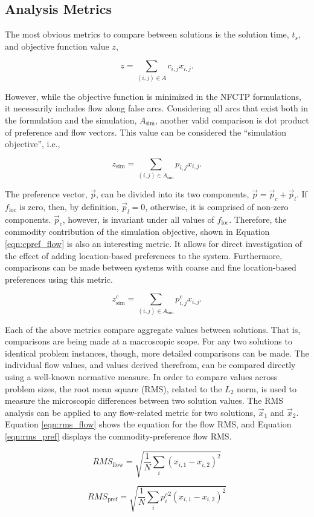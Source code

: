 \subsection{Analysis Metrics}

The most obvious metrics to compare between solutions is the solution time,
$t_s$, and objective function value $z$,

\begin{equation}\label{eqn:obj_flow}
z = \sum_{(i, j) \in A} c_{i, j} x_{i, j}.
\end{equation}

However, while the objective function is minimized in the NFCTP formulations, it
necessarily includes flow along false arcs. Considering all arcs that exist both
in the formulation and the simulation, $A_{\text{sim}}$, another valid
comparison is dot product of preference and flow vectors. This value can be
considered the ``simulation objective'', i.e.,

\begin{equation}\label{eqn:sim_flow}
z_{\text{sim}} = \sum_{(i, j) \in A_{\text{sim}}} p_{i, j} x_{i, j}.
\end{equation}

The preference vector, $\vec{p}$, can be divided into its two components,
$\vec{p} = \vec{p}_c + \vec{p}_l$. If $f_{\text{loc}}$ is zero, then, by
definition, $\vec{p}_l = 0$, otherwise, it is comprised of non-zero
components. $\vec{p}_c$, however, is invariant under all values of
$f_{\text{loc}}$. Therefore, the commodity contribution of the simulation
objective, shown in Equation \ref{eqn:cpref_flow} is also an interesting
metric. It allows for direct investigation of the effect of adding
location-based preferences to the system. Furthermore, comparisons can be made
between systems with coarse and fine location-based preferences using this
metric.

\begin{equation}\label{eqn:cpref_flow}
z^c_{\text{sim}} = \sum_{(i, j) \in A_{\text{sim}}} p^c_{i, j} x_{i, j}.
\end{equation}

Each of the above metrics compare aggregate values between solutions. That is,
comparisons are being made at a macroscopic scope. For any two solutions to
identical problem instances, though, more detailed comparisons can be made. The
individual flow values, and values derived therefrom, can be compared directly
using a well-known normative measure. In order to compare values across problem
sizes, the root mean square (RMS), related to the $L_2$ norm, is used to measure
the microscopic differences between two solution values. The RMS analysis can be
applied to any flow-related metric for two solutions, $\vec{x}_1$ and
$\vec{x}_2$. Equation \ref{eqn:rms_flow} shows the equation for the flow RMS,
and Equation \ref{eqn:rms_pref} displays the commodity-preference flow RMS.

\begin{equation}\label{eqn:rms_flow}
RMS_{\text{flow}} = \sqrt{ \frac{1}{N} \sum_i (x_{i, 1} - x_{i, 2}) ^2 }
\end{equation}

\begin{equation}\label{eqn:rms_pref}
RMS_{\text{pref}} = \sqrt{ \frac{1}{N} \sum_i {p_i^c}^2 (x_{i, 1} - x_{i, 2})^2 }
\end{equation}

